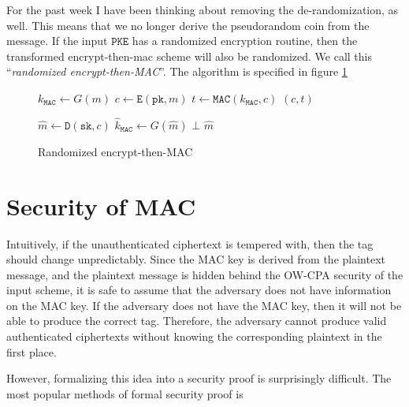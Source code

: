 \documentclass{article}
\newcommand{\monospace}{\texttt}
\newcommand{\pke}{\monospace{PKE}}
\newcommand{\encrypt}{\monospace{E}}
\newcommand{\decrypt}{\monospace{D}}
\newcommand{\etm}{\monospace{EtM}}  %
\newcommand{\mac}{\monospace{MAC}}
\newcommand{\sign}{\monospace{MAC}}
\newcommand{\verify}{\monospace{MAC.Verify}}
\newcommand{\pk}{\monospace{pk}}
\newcommand{\sk}{\monospace{sk}}
\newcommand{\rand}{\$}
\begin{document}
For the past week I have been thinking about removing the de-randomization, as well. This means that we no longer derive the pseudorandom coin from the message. If the input $\pke$ has a randomized encryption routine, then the transformed encrypt-then-mac scheme will also be randomized. We call this ``\emph{randomized encrypt-then-MAC}''. The algorithm is specified in figure \ref{fig:rand-etm}

\begin{figure}[h]
    \center
    \begin{minipage}{0.49\textwidth}
        \begin{algorithm}[H]
            \caption{$\encrypt^\rand_\etm(\pk, m)$}\label{alg:rand-etm-encrypt}
            \begin{algorithmic}[1]
                \State $k_\mac \leftarrow G(m)$
                \State $c \leftarrow \encrypt(\pk, m)$
                \State $t \leftarrow \sign(k_\mac, c)$
                \State \Return $(c, t)$
            \end{algorithmic}
        \end{algorithm}
    \end{minipage}
    \hfill
    \begin{minipage}{0.49\textwidth}
        \begin{algorithm}[H]
            \caption{$\decrypt^\rand_\etm(\sk, (c, t))$}\label{alg:rand-etm-decrypt}
            \begin{algorithmic}[1]
                \State $\hat{m} \leftarrow \decrypt(\sk, c)$
                \State $\hat{k}_\mac \leftarrow G(\hat{m})$
                \If{$\verify(\hat{k}_\mac, c, t) \neq 1$}
                    \State \Return $\bot$
                \EndIf
                \State \Return $\hat{m}$
            \end{algorithmic}
        \end{algorithm}
    \end{minipage}
    \caption{Randomized encrypt-then-MAC}\label{fig:rand-etm}
\end{figure}

\section{Security of MAC}
Intuitively, if the unauthenticated ciphertext is tempered with, then the tag should change unpredictably. Since the MAC key is derived from the plaintext message, and the plaintext message is hidden behind the OW-CPA security of the input scheme, it is safe to assume that the adversary does not have information on the MAC key. If the adversary does not have the MAC key, then it will not be able to produce the correct tag. Therefore, the adversary cannot produce valid authenticated ciphertexts without knowing the corresponding plaintext in the first place.

However, formalizing this idea into a security proof is surprisingly difficult. The most popular methods of formal security proof is 



\end{document}
